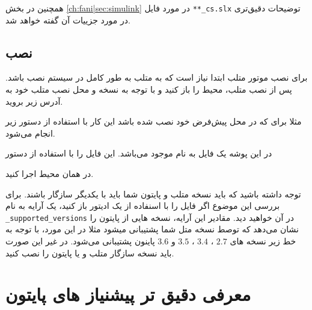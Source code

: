 همچنین در بخش  
\ref{ch:fani|sec:simulink}
در مورد فایل \texttt{**\_cs.slx} توضیحات دقیق‌تری در مورد جزییات آن گفته خواهد شد.





\subsection{نصب
}
برای نصب موتور متلب ابتدا نیاز است که به متلب به طور کامل در سیستم نصب باشد. پس از نصب متلب، محیط  را باز کنید و با توجه به نسخه و محل نصب متلب خود به آدرس زیر بروید.

\begin{center}
\end{center}

مثلا برای  که در محل پیش‌فرض خود نصب شده باشد این کار با استفاده از دستور زیر انجام می‌شود.

\begin{center}
\end{center}

در این پوشه یک فایل به نام  موجود می‌باشد. این فایل را با استفاده از دستور 

\begin{center}
\end{center}

در همان محیط  اجرا کنید.

\begin{note}
	توجه داشته باشید که باید نسخه متلب و پایتون شما باید با یکدیگر سازگار باشند. برای بررسی این موضوع اگر فایل  را با اسنفاده از یک ادیتور باز کنید، یک آرایه به نام \texttt{\_supported\_versions} در آن خواهید دید. مقادیر این آرایه، نسخه هایی از پایتون را نشان می‌دهد که توصط نسخه متل شما پشتیبانی میشود مثلا در این مورد، با توجه به خط زیر نسخه های $2.7$ ، $3.4$ ، $3.5$ و $3.6$ پاینون پشتیبانی می‌شود. در غیر این صورت باید نسخه سازگار متلب و یا پایتون را نصب کنید.
	\begin{center}
	\end{center}
\end{note}

\section{معرفی دقیق تر پیشنیاز های پایتون}\label{ch:req|sec:python-req}
